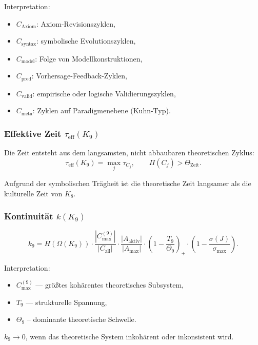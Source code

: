 Interpretation:
\begin{itemize}
    \item $C_{\mathrm{Axiom}}$: Axiom-Revisionszyklen,
    \item $C_{\mathrm{syntax}}$: symbolische Evolutionszyklen,
    \item $C_{\mathrm{model}}$: Folge von Modellkonstruktionen,
    \item $C_{\mathrm{pred}}$: Vorhersage-Feedback-Zyklen,
    \item $C_{\mathrm{valid}}$: empirische oder logische Validierungszyklen,
    \item $C_{\mathrm{meta}}$: Zyklen auf Paradigmenebene (Kuhn-Typ).
\end{itemize}

\subsubsection{Effektive Zeit \texorpdfstring{$\tau_{\mathrm{eff}}(K_9)$}{tau_eff(K9)}}

Die Zeit entsteht aus dem langsamsten, nicht abbaubaren theoretischen Zyklus:
\[
\tau_{\mathrm{eff}}(K_9)=\max_j \tau_{C_j},
\qquad
\Pi(C_j) > \Theta_{\mathrm{Zeit}}.
\]

Aufgrund der symbolischen Trägheit ist die theoretische Zeit langsamer als die kulturelle Zeit von $K_8$.

\subsubsection{Kontinuität \texorpdfstring{$k(K_9)$}{k(K_9)}}

\[
k_9 =
H(\Omega(K_9))
\cdot
\frac{|C_{\max}^{(9)}|}{|C_{\mathrm{all}}|}
\cdot
\frac{|A_{\mathrm{aktiv}}|}{|A_{\max}|}
\cdot
\left(1-\frac{T_9}{\Theta_9}\right)_+
\cdot
\left(1-\frac{\sigma(J)}{\sigma_{\max}}\right).
\]

Interpretation:
\begin{itemize}
    \item $C_{\max}^{(9)}$ — größtes kohärentes theoretisches Subsystem,
    \item $T_9$ — strukturelle Spannung,
    \item $\Theta_9$ – dominante theoretische Schwelle.
\end{itemize}

$k_9 \to 0$, wenn das theoretische System inkohärent oder inkonsistent wird.

